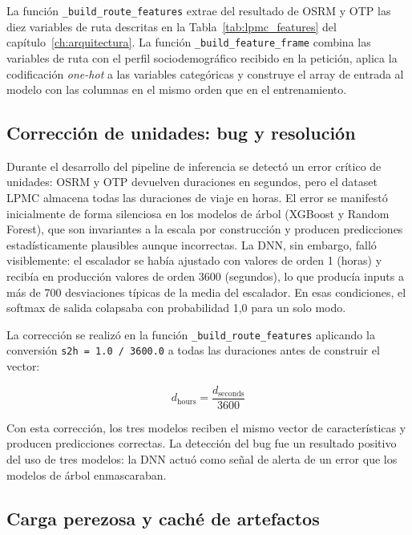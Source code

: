 La función \texttt{\_build\_route\_features} extrae del resultado de OSRM y OTP las diez variables de ruta descritas en la Tabla~\ref{tab:lpmc_features} del capítulo~\ref{ch:arquitectura}. La función \texttt{\_build\_feature\_frame} combina las variables de ruta con el perfil sociodemográfico recibido en la petición, aplica la codificación \textit{one-hot} a las variables categóricas y construye el array de entrada al modelo con las columnas en el mismo orden que en el entrenamiento.

\subsection{Corrección de unidades: bug y resolución}
\label{subsec:bug_unidades}

Durante el desarrollo del pipeline de inferencia se detectó un error crítico de unidades: OSRM y OTP devuelven duraciones en segundos, pero el dataset LPMC almacena todas las duraciones de viaje en horas. El error se manifestó inicialmente de forma silenciosa en los modelos de árbol (XGBoost y Random Forest), que son invariantes a la escala por construcción y producen predicciones estadísticamente plausibles aunque incorrectas. La DNN, sin embargo, falló visiblemente: el escalador se había ajustado con valores de orden 1 (horas) y recibía en producción valores de orden 3600 (segundos), lo que producía inputs a más de 700 desviaciones típicas de la media del escalador. En esas condiciones, el softmax de salida colapsaba con probabilidad 1,0 para un solo modo.

La corrección se realizó en la función \texttt{\_build\_route\_features} aplicando la conversión \texttt{s2h = 1.0 / 3600.0} a todas las duraciones antes de construir el vector:

\begin{equation}
  d_{\text{hours}} = \frac{d_{\text{seconds}}}{3600}
\end{equation}

Con esta corrección, los tres modelos reciben el mismo vector de características y producen predicciones correctas. La detección del bug fue un resultado positivo del uso de tres modelos: la DNN actuó como señal de alerta de un error que los modelos de árbol enmascaraban.

\subsection{Carga perezosa y caché de artefactos}

